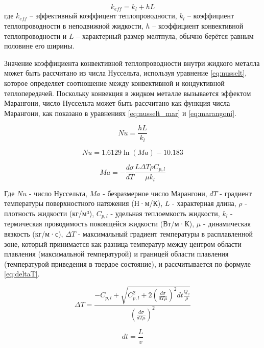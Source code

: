 \begin{equation}
    k_{eff} = k_l + hL
\end{equation}
где $k_{eff}$ -- эффективный коэффицент теплопроводности, $k_l$ -- коэффициент теплопроводности в неподвижной жидкости, $h$ -- коэффициент конвективной теплопроводности и $L$ -- характерный размер мелтпула, обычно берётся равным половине его ширины.  

Значение коэффициента конвективной теплопроводности внутри жидкого металла может быть рассчитано из числа Нуссельта, используя уравнение \ref{eq:nusselt}, которое определяет соотношение между конвективной и кондуктивной теплопередачей. Поскольку конвекция в жидком металле вызывается эффектом Марангони, число Нуссельта может быть рассчитано как функция числа Марангони, как показано в уравнениях \ref{eq:nusselt_mar} и \ref{eq:marangoni}.

\begin{equation}
    \label{eq:nusselt}
    Nu = \frac{hL}{k_l}
\end{equation}

\begin{equation}
    \label{eq:nusselt_mar}
    Nu = 1.6129\ln (Ma) - 10.183
\end{equation}

\begin{equation}
    \label{eq:marangoni}
    Ma = - \frac{d\sigma}{dT} \frac{L\Delta T \rho C_{p,l}}{\mu k_l}
\end{equation}

Где $Nu$ - число Нуссельта, $Ma$ - безразмерное число Марангони, $dT$ - градиент температуры поверхностного натяжения (Н·м/К), $L$ - характерная длина, $\rho$ - плотность жидкости (кг/м³), $C_{p,l}$ - удельная теплоемкость жидкости, $k_l$ - термическая проводимость покоящейся жидкости (Вт/м·К), $\mu$ - динамическая вязкость (кг/м·с), $\Delta T$ - максимальный градиент температуры в расплавленной зоне, который принимается как разница температур между центром области плавления (максимальной температурой) и границей области плавления (температурой приведения в твердое состояние), и рассчитывается по формуле \ref{eq:deltaT}.

\begin{equation}
    \label{eq:deltaT}
    \Delta T = \frac{
        -C_{p,l} + \sqrt{
            C^2_{p,l} + 2\left(\frac{d\sigma}{dT\mu}\right)^2 dt\frac{Q_v}\rho
            }
        }{
            \left(\frac{d\sigma}{dT\mu}\right)^2
        }
\end{equation}

\begin{equation}
    dt = \frac{L}{v}
\end{equation}

\clearpage
